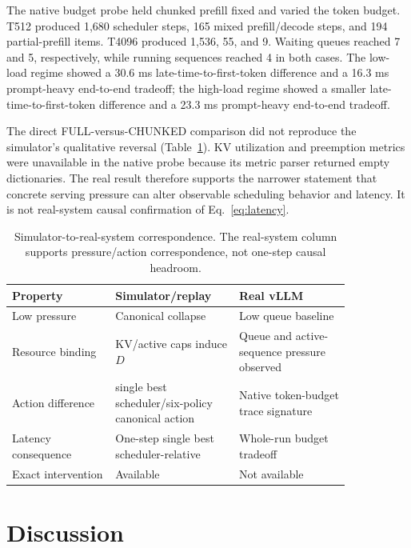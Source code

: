 \documentclass[preprint,12pt]{elsarticle}
\begin{document}
The native budget probe held chunked prefill fixed and varied the token budget.
T512 produced 1,680 scheduler steps, 165 mixed prefill/decode steps, and 194
partial-prefill items. T4096 produced 1,536, 55, and 9. Waiting queues reached
7 and 5, respectively, while running sequences reached 4 in both cases. The
low-load regime showed a 30.6 ms late-time-to-first-token difference and a 16.3 ms
prompt-heavy end-to-end tradeoff; the high-load regime showed a smaller late-time-to-first-token
difference and a 23.3 ms prompt-heavy end-to-end tradeoff.

The direct FULL-versus-CHUNKED comparison did not reproduce the simulator's
qualitative reversal (Table~\ref{tab:real}). KV utilization and preemption metrics were unavailable
in the native probe because its metric parser returned empty dictionaries.
The real result therefore supports the narrower statement that concrete
serving pressure can alter observable scheduling behavior and latency. It is
not real-system causal confirmation of Eq.~\ref{eq:latency}.

\begin{table}[t]
\centering
\small
\caption{Simulator-to-real-system correspondence. The real-system column
supports pressure/action correspondence, not one-step causal headroom.}
\label{tab:real}
\setlength{\tabcolsep}{8pt}
\renewcommand{\arraystretch}{1.3}
\begin{tabular}{@{}p{0.26\linewidth}p{0.29\linewidth}p{0.29\linewidth}@{}}
\toprule
Property & Simulator/replay & Real vLLM \\
\midrule
Low pressure & Canonical collapse & Low queue baseline \\
Resource binding & KV/active caps induce $D$ & Queue and active-sequence pressure observed \\
Action difference & single best scheduler/six-policy canonical action & Native token-budget trace signature \\
Latency consequence & One-step single best scheduler-relative & Whole-run budget tradeoff \\
Exact intervention & Available & Not available \\
\bottomrule
\end{tabular}
\end{table}

\section{Discussion}
\label{sec:discussion}
\end{document}
